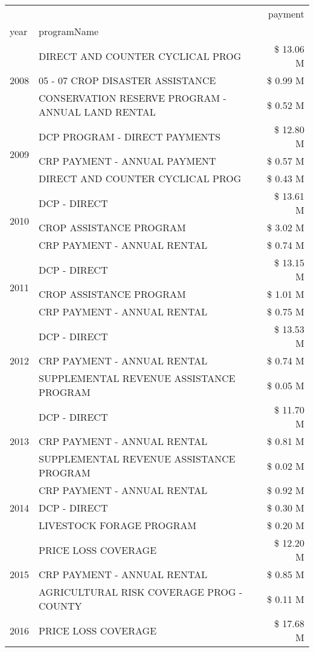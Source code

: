 \begin{tabular}{llr}
\toprule
 &  & payment \\
year & programName &  \\
\midrule
\multirow[t]{3}{*}{2008} & DIRECT AND COUNTER CYCLICAL PROG & \$ 13.06 M \\
 & 05 - 07 CROP DISASTER ASSISTANCE & \$ 0.99 M \\
 & CONSERVATION RESERVE PROGRAM - ANNUAL LAND RENTAL & \$ 0.52 M \\
\cline{1-3}
\multirow[t]{3}{*}{2009} & DCP PROGRAM - DIRECT PAYMENTS & \$ 12.80 M \\
 & CRP PAYMENT - ANNUAL PAYMENT & \$ 0.57 M \\
 & DIRECT AND COUNTER CYCLICAL PROG & \$ 0.43 M \\
\cline{1-3}
\multirow[t]{3}{*}{2010} & DCP - DIRECT & \$ 13.61 M \\
 & CROP ASSISTANCE PROGRAM & \$ 3.02 M \\
 & CRP PAYMENT - ANNUAL RENTAL & \$ 0.74 M \\
\cline{1-3}
\multirow[t]{3}{*}{2011} & DCP - DIRECT & \$ 13.15 M \\
 & CROP ASSISTANCE PROGRAM & \$ 1.01 M \\
 & CRP PAYMENT - ANNUAL RENTAL & \$ 0.75 M \\
\cline{1-3}
\multirow[t]{3}{*}{2012} & DCP - DIRECT & \$ 13.53 M \\
 & CRP PAYMENT - ANNUAL RENTAL & \$ 0.74 M \\
 & SUPPLEMENTAL REVENUE ASSISTANCE PROGRAM & \$ 0.05 M \\
\cline{1-3}
\multirow[t]{3}{*}{2013} & DCP - DIRECT & \$ 11.70 M \\
 & CRP PAYMENT - ANNUAL RENTAL & \$ 0.81 M \\
 & SUPPLEMENTAL REVENUE ASSISTANCE PROGRAM & \$ 0.02 M \\
\cline{1-3}
\multirow[t]{3}{*}{2014} & CRP PAYMENT - ANNUAL RENTAL & \$ 0.92 M \\
 & DCP - DIRECT & \$ 0.30 M \\
 & LIVESTOCK FORAGE PROGRAM & \$ 0.20 M \\
\cline{1-3}
\multirow[t]{3}{*}{2015} & PRICE LOSS COVERAGE & \$ 12.20 M \\
 & CRP PAYMENT - ANNUAL RENTAL & \$ 0.85 M \\
 & AGRICULTURAL RISK COVERAGE PROG - COUNTY & \$ 0.11 M \\
\cline{1-3}
\multirow[t]{3}{*}{2016} & PRICE LOSS COVERAGE & \$ 17.68 M \\

\end{tabular}
